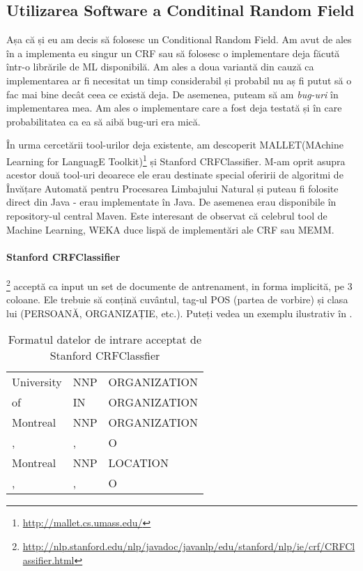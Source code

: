 \subsection{Utilizarea Software a Conditinal Random Field}

Așa că și eu am decis să folosesc un Conditional Random Field. Am avut de ales în a implementa eu singur un CRF sau să folosesc o implementare deja făcută într-o librările de ML disponibilă. Am ales a doua variantă din cauză ca implementarea ar fi necesitat un timp considerabil și probabil nu aș fi putut să o fac mai bine decât ceea ce există deja. De asemenea, puteam să am \textit{bug-uri} în implementarea mea. Am ales o implementare care a fost deja testată și în care probabilitatea ca ea să aibă bug-uri era mică.


În urma cercetării tool-urilor deja existente, am descoperit MALLET(MAchine Learning for LanguagE Toolkit)\footnote{\url{http://mallet.cs.umass.edu/}} și Stanford CRFClassifier. M-am oprit asupra acestor două tool-uri deoarece ele erau destinate special oferirii de algoritmi de Învățare Automată pentru Procesarea Limbajului Natural și puteau fi folosite direct din Java - erau implementate în Java. De asemenea erau disponibile în repository-ul central Maven. Este interesant de observat că celebrul tool de Machine Learning, WEKA duce lispă de implementări ale CRF sau MEMM. 


\paragraph{Stanford CRFClassifier}\footnote{\url{http://nlp.stanford.edu/nlp/javadoc/javanlp/edu/stanford/nlp/ie/crf/CRFClassifier.html}} acceptă ca input un set de documente de antrenament, in forma implicită, pe 3 coloane. Ele trebuie să conțină cuvântul, tag-ul POS (partea de vorbire) și clasa lui (PERSOANĂ, ORGANIZAȚIE, etc.). Puteți vedea un exemplu ilustrativ în .

\begin{center}
\begin{table}[htb]
  \caption{Formatul datelor de intrare acceptat de Stanford CRFClassfier}
  \begin{tabular}{l l l}
   University & NNP & ORGANIZATION \\
   of & IN & ORGANIZATION \\
   Montreal & NNP & ORGANIZATION \\
   ,& , & O \\
   Montreal & NNP & LOCATION\\
   ,& ,& O\\
  \end{tabular}
  \label{table:input-crf}
\end{table}
\end{center}

